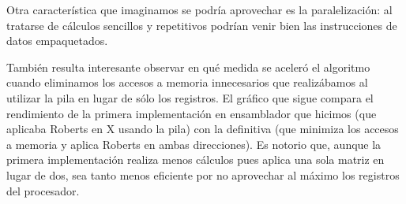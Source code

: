 Otra característica que imaginamos se podría aprovechar es la paralelización: al tratarse de cálculos sencillos y repetitivos podrían venir bien las instrucciones de datos empaquetados.

También resulta interesante observar en qué medida se aceleró el algoritmo cuando eliminamos los accesos a memoria innecesarios que realizábamos al utilizar la pila en lugar de sólo los registros. El gráfico que sigue compara el rendimiento de la primera implementación en ensamblador que hicimos (que aplicaba Roberts en X usando la pila) con la definitiva (que minimiza los accesos a memoria y aplica Roberts en ambas direcciones). Es notorio que, aunque la primera implementación realiza menos cálculos pues aplica una sola matriz en lugar de dos, sea tanto menos eficiente por no aprovechar al máximo los registros del procesador.

